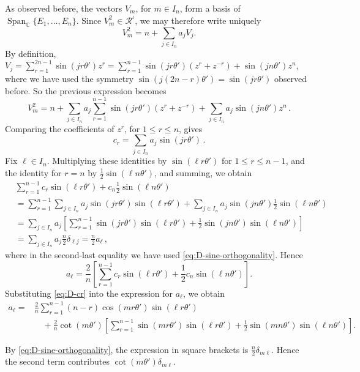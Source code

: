 \documentclass[a4paper,reqno]{amsart}
\theoremstyle{plain} %
\theoremstyle{definition} %
\theoremstyle{remark} %
\newcommand{\1}{\mathds{1}}   %
\begin{document}
As observed before, the vectors $V_m$, for $m\in I_n$, form a basis of 
$\operatorname{Span}_{\mathbb C} \{E_1,\ldots,E_n\}$. 
Since \(V_m^2\in \mathcal R^\iota\), we may therefore write uniquely
\[
V_m^2
=
n+\sum_{j\in I_n}a_j V_j.
\]
By definition, $V_j = \sum_{r=1}^{2n-1}\sin (j r \theta')z^r = \sum_{r=1}^{n-1}\sin (j r \theta')(z^r +z^{-r}) + \sin (j n \theta') z^n$,
where  we have used the symmetry $\sin(j(2n-r)\theta')=\sin(j r\theta')$ observed before.
So the previous expression becomes
\[
V_m^2 =  n+\sum_{j\in I_n}a_j \sum_{r=1}^{n-1}\sin (j r \theta')(z^r + z^{-r} ) + \sum_{j\in I_n}a_j \sin (j n \theta') z^n  \, .
\]
Comparing the coefficients of \(z^r\), for \(1\le r\le n\), gives
\begin{equation*}
c_r = \sum_{j\in I_n}a_j \sin (j r \theta') \, .
\end{equation*}
Fix \(\ell\in I_n\). Multiplying these identities by \(\sin(\ell r\theta')\) for \(1\le r\le n-1\), and the identity for \(r=n\) 
by \(\frac12\sin(\ell n\theta')\), and summing, we obtain
\begin{align*}
&\sum_{r=1}^{n-1}c_r\sin (\ell r\theta') + c_n \frac{1}{2}\sin (\ell n\theta') \\
&= \sum_{r=1}^{n-1}\sum_{j \in I_n}a_j \sin (j r \theta')\sin (\ell r\theta')+ 
\sum_{j \in I_n}a_j \sin (j n \theta')\frac{1}{2}\sin(\ell n\theta') \\
& = \sum_{j \in I_n} a_j \left[ \sum_{r=1}^{n-1} \sin (j r \theta')\sin (\ell r\theta') + \frac{1}{2}\sin (j n \theta')\sin(\ell n\theta') \right] \\
& = \sum_{j \in I_n} a_j \frac{n}{2}\delta_{\ell j} = \frac{n}{2} a_\ell \, ,
\end{align*} 
where in the second-last equality we have used  \eqref{eq:D-sine-orthogonality}. 
Hence
\[
a_\ell
=
\frac2n
\left[
\sum_{r=1}^{n-1}
c_r\sin(\ell r\theta')
+
\frac12c_n\sin(\ell n\theta')
\right].
\]
Substituting \eqref{eq:D-cr} into the expression for $a_\ell$, we obtain
\[
\begin{aligned}
a_\ell
={}&
\frac{2}{n}
\sum_{r=1}^{n-1}
(n-r)\cos(mr\theta')\sin(\ell r\theta')
\\
&\quad
+\frac{2}{n}\cot(m\theta')
\left[
\sum_{r=1}^{n-1}
\sin(mr\theta')\sin(\ell r\theta')
+
\frac12
\sin(mn\theta')\sin(\ell n\theta')
\right].
\end{aligned}
\]

By \eqref{eq:D-sine-orthogonality}, the expression in square brackets is $\frac n2\delta_{m\ell}$.
Hence the second term contributes $\cot(m\theta')\delta_{m\ell}$. 
\end{document}
